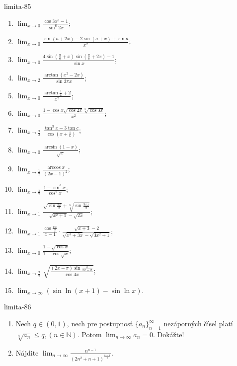 \begin{defproblem}{limita-85}
\begin{multicols}{2}
\begin{enumerate}
    \item $\lim_{x \rightarrow 0} \frac{\cos 3x^3-1}{\sin ^6 2x}$;
    \item $\lim_{x \rightarrow 0} \frac{\sin (a+2x)-2\sin (a+x)+\sin a}{x^2}$;
    \item $\lim_{x \rightarrow 0} \frac{4\sin (\frac{\pi}{6}+x)\sin (\frac{\pi}{6}+2x)-1}{\sin x}$;

    \item $\lim_{x \rightarrow 2} \frac{\arctan (x^2-2x)}{\sin 3\pi x}$;
    \item $\lim_{x \rightarrow 0} \frac{\arctan \frac{1}{x}+2}{x^2}$;
    \item $\lim_{x \rightarrow 0} \frac{1-\cos x\sqrt{\cos 2x}\sqrt[3]{\cos 3x}}{x^2}$;
    \item $\lim_{x \rightarrow \frac{\pi}{3}} \frac{\tan^3 x-3 \tan c}{\cos (x+\frac{\pi}{6})}$;
    \item $\lim_{x \rightarrow 0} \frac{\arcsin (1-x)}{\sqrt{x}}$;
    \item $\lim_{x \rightarrow \frac{1}{2}} \frac{\arccos x}{(2x-1)^2}$;
    \item $\lim_{x \rightarrow \frac{\pi}{2}} \frac{1-\sin ^3 x}{\cos ^2 x}$;
    \item $\lim_{x \rightarrow 1} \frac{\sqrt{\sin \frac{\pi x}{2}}+\sqrt[3]{\sin \frac{3\pi x}{2}}}{\sqrt{x^2+1}-\sqrt{2x}}$;
    \item $\lim_{x \rightarrow 1} \frac{\cos \frac{\pi x}{2}}{x-1}\cdot \frac{\sqrt{x+3}-2}{\sqrt{x^3+3x}-\sqrt{3x^2+1}}$;
    \item $\lim_{x \rightarrow 0} \frac{1-\sqrt{\cos x}}{1-\cos \sqrt{x}}$;
    \item $\lim_{x \rightarrow \frac{\pi}{2}} \sqrt{\frac{(2x-\pi)\sin \frac{\pi}{2x-\pi}}{\cos 4x}}$;
    \item $\lim_{x \rightarrow \infty} (\sin \ln (x+1)-\sin \ln x)$.
\end{enumerate}
\end{multicols}
\end{defproblem}

\begin{defproblem}{limita-86}
\begin{enumerate}
\item Nech $q \in (0,1)$, nech pre postupnosť ${\{a_n\}}_{n=1}^\infty$ nezáporných čísel platí $\sqrt[n]{a_n}\leq q,(n \in \mathbb{N})$. Potom $\lim_{n \rightarrow \infty} a_n=0$. Dokážte!
\item Nájdite $\lim_{n \rightarrow \infty}\frac{n^{n-1}}{(2n^2+n+1)^{\frac{n+1}{2}}}$.
\end{enumerate}
\end{defproblem}

